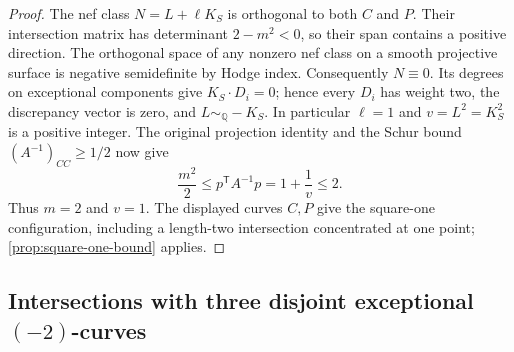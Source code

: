 \documentclass[11pt,reqno]{amsart}
\theoremstyle{definition}
\theoremstyle{remark}
\newcommand{\QQ}{\mathbb Q}
\numberwithin{equation}{section}
\begin{document}
\begin{proof}
The nef class $N=L+\ell K_S$ is orthogonal to both $C$ and $P$.
Their intersection matrix has determinant $2-m^2<0$, so their span
contains a positive direction. The orthogonal space of any nonzero
nef class on a smooth projective surface is negative semidefinite
by Hodge index. Consequently $N\equiv0$.
Its degrees on exceptional components give $K_S\cdot D_i=0$; hence every
$D_i$ has weight two, the discrepancy vector is zero, and $L\sim_{\QQ}-K_S$.
In particular $\ell=1$ and $v=L^2=K_S^2$ is a positive integer.
The original projection identity and the Schur bound
$(A^{-1})_{CC}\ge1/2$ now give
\[
 \frac{m^2}{2}\le p^{\mathsf T}A^{-1}p=1+\frac1v\le2.
\]
Thus $m=2$ and $v=1$. The displayed curves $C,P$ give the square-one configuration,
including a length-two intersection concentrated at one point;
\cref{prop:square-one-bound} applies.
\end{proof}


\subsection{Intersections with three disjoint exceptional $(-2)$-curves}
\end{document}
